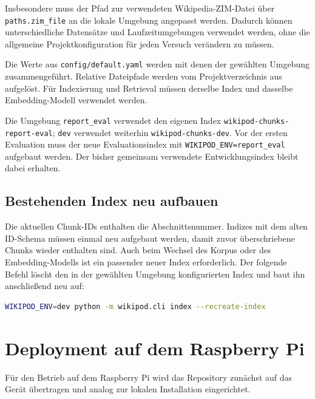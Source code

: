 Insbesondere muss der Pfad zur verwendeten Wikipedia-ZIM-Datei über
\texttt{paths.zim\_file} an die lokale Umgebung angepasst werden. Dadurch
können unterschiedliche Datensätze und Laufzeitumgebungen verwendet werden,
ohne die allgemeine Projektkonfiguration für jeden Versuch verändern zu
müssen.

Die Werte aus \texttt{config/\allowbreak{}default.\allowbreak{}yaml} werden mit denen der gewählten
Umgebung zusammengeführt. Relative Dateipfade werden vom Projektverzeichnis
aus aufgelöst. Für Indexierung und Retrieval müssen derselbe Index und
dasselbe Embedding-Modell verwendet werden.

Die Umgebung \texttt{report\_eval} verwendet den eigenen Index
\texttt{wikipod-\allowbreak{}chunks-\allowbreak{}report-\allowbreak{}eval}; \texttt{dev} verwendet weiterhin
\texttt{wikipod-chunks-dev}. Vor der ersten Evaluation muss der neue
Evaluationsindex mit \texttt{WIKIPOD\_\allowbreak{}ENV=report\_\allowbreak{}eval} aufgebaut werden.
Der bisher gemeinsam verwendete Entwicklungsindex bleibt dabei erhalten.

\subsection{Bestehenden Index neu aufbauen}

Die aktuellen Chunk-IDs enthalten die Abschnittsnummer. Indizes mit dem alten
ID-Schema müssen einmal neu aufgebaut werden, damit zuvor überschriebene
Chunks wieder enthalten sind. Auch beim Wechsel des Korpus oder des
Embedding-Modells ist ein passender neuer Index erforderlich. Der folgende
Befehl löscht den in der gewählten Umgebung konfigurierten Index und baut ihn
anschließend neu auf:

\par\nopagebreak[4]\smallskip
\noindent\begin{minipage}[t]{\linewidth}
\vspace{0pt}
\begin{lstlisting}[language=bash]
WIKIPOD_ENV=dev python -m wikipod.cli index --recreate-index
\end{lstlisting}
\end{minipage}\par\smallskip

\section{Deployment auf dem Raspberry Pi}

Für den Betrieb auf dem Raspberry Pi wird das Repository zunächst auf das
Gerät übertragen und analog zur lokalen Installation eingerichtet.

